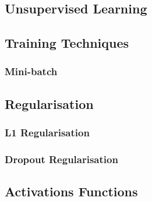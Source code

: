 \documentclass[11pt]{article}
\begin{document}
\subsection{Unsupervised Learning}

\subsection{Training Techniques}
\subsubsection{Mini-batch}
\subsection{Regularisation}
\subsubsection{L1 Regularisation}
\subsubsection{Dropout Regularisation}
\subsection{Activations Functions}
\end{document}
